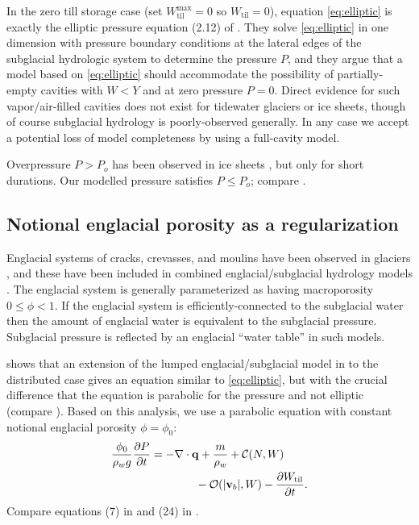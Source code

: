 \documentclass[gmd]{copernicus}   %
\newcommand{\text}{\textrm}
\newcommand\bv{\mathbf{v}}
\newcommand\bq{\mathbf{q}}
\newcommand{\ddt}[1]{\ensuremath{\frac{\partial #1}{\partial t}}}
\newcommand{\Div}{\nabla\cdot}
\newcommand{\Wtil}{W_{\text{til}}}
\newcommand{\Wtilmax}{W_{\text{til}}^{\text{max}}}
\begin{document}
In the zero till storage case (set $\Wtilmax=0$ so $\Wtil=0$), equation \eqref{eq:elliptic} is exactly the elliptic pressure equation (2.12) of \cite{Schoofetal2012}.  They solve \eqref{eq:elliptic} in one dimension with pressure boundary conditions at the lateral edges of the subglacial hydrologic system to determine the pressure $P$, and they argue that a model based on \eqref{eq:elliptic} should accommodate the possibility of partially-empty cavities with $W<Y$ and at zero pressure $P=0$.  Direct evidence for such vapor/air-filled cavities does not exist for tidewater glaciers or ice sheets, though of course subglacial hydrology is poorly-observed generally.  In any case we accept a potential loss of model completeness by using a full-cavity model.

Overpressure $P>P_o$ has been observed in ice sheets \citep[for example]{Dasetal08,Bartholomausetal2011}, but only for short durations.  Our modelled pressure satisfies $P\le P_o$; compare \cite{Werderetal2013}.

\subsection{Notional englacial porosity as a regularization}  Englacial systems of cracks, crevasses, and moulins have been observed in glaciers \citep[for example]{Fountainetal2005,Bartholomausetal2008,Harperetal2010}, and these have been included in combined englacial/subglacial hydrology models \citep{FlowersClarke2002_theory,Bartholomausetal2011,Hewitt2013,Werderetal2013}.  The englacial system is generally parameterized as having macroporosity $0\le \phi < 1$.  If the englacial system is efficiently-connected to the subglacial water then the amount of englacial water is equivalent to the subglacial pressure.  Subglacial pressure is reflected by an englacial ``water table'' in such models.

\cite{Bueler2014correspondence} shows that an extension of the lumped englacial/subglacial model in \cite{Bartholomausetal2011} to the distributed case gives an equation similar to \eqref{eq:elliptic}, but with the crucial difference that the equation is parabolic for the pressure and not elliptic (compare \cite{Hewittetal2012}).  Based on this analysis, we use a parabolic equation with constant notional englacial porosity $\phi=\phi_0$:
\begin{align}
\frac{\phi_0}{\rho_w g} \ddt{P} &= - \Div \bq + \frac{m}{\rho_w} + \mathcal{C}(N,W)  \label{eq:regpressureequation} \\
  &\qquad\qquad - \mathcal{O}(|\bv_b|,W) - \ddt{\Wtil}. \notag
\end{align}
Compare equations (7) in \cite{Hewitt2013} and (24) in \cite{Werderetal2013}.
\end{document}
